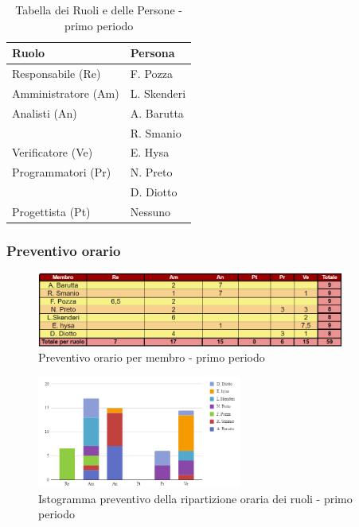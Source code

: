 \begin{table}[H]
    \centering
    \begin{tabular}{|l|l|}
        \hline
        \textbf{Ruolo} & \textbf{Persona} \\
        \hline
        \hline
        Responsabile (Re) & F. Pozza \\
        \hline
        Amministratore (Am) & L. Skenderi \\
        \hline
        Analisti (An) & A. Barutta \\
        & R. Smanio \\
        \hline
        Verificatore (Ve) & E. Hysa \\
        \hline
        Programmatori (Pr) & N. Preto \\
        & D. Diotto \\
        \hline
        Progettista (Pt) & Nessuno \\
        \hline
    \end{tabular}
    \caption{Tabella dei Ruoli e delle Persone - primo periodo}
    \label{tab:Ruoli_persone_1}
    \end{table}

\subsubsection*{Preventivo orario} \hspace{1pt}

\begin{figure}[H]
    \centering
    \includegraphics[width=0.9\textwidth]{../Images/preventivoOrario1Periodo.png}
    \caption{Preventivo orario per membro - primo periodo}
    \label{fig:Preventivo_orario_1}
\end{figure}

\begin{figure}[H]
    \centering
    \includegraphics[width=0.6\textwidth]{../Images/preventivoDivisioneRuoli1Periodo.png}
    \caption{Istogramma preventivo della ripartizione oraria dei ruoli - primo periodo}
    \label{fig:Preventivo_ripartizione_oraria_1}
\end{figure}

